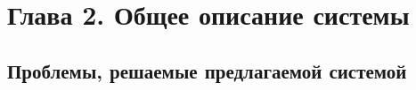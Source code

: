 \documentclass[a4paper,12pt]{article}
\begin{document}


\section{Глава 2. Общее описание системы}

\subsection{Проблемы, решаемые предлагаемой системой}
\end{document}
